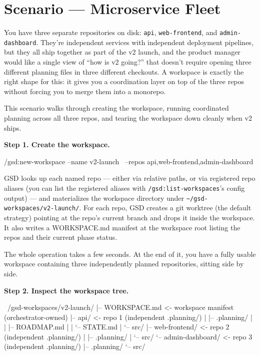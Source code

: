 \documentclass[11pt,letterpaper,openany]{book}
\begin{document}
\chapter{Scenario --- Microservice Fleet}

\begin{gsdscenario}

You have three separate repositories on disk: \texttt{api},
\texttt{web-frontend}, and \texttt{admin-dashboard}. They're
independent services with independent deployment pipelines, but
they all ship together as part of the v2 launch, and the product
manager would like a single view of ``how is v2 going?'' that
doesn't require opening three different planning files in three
different checkouts. A workspace is exactly the right shape for
this: it gives you a coordination layer on top of the three repos
without forcing you to merge them into a monorepo.

This scenario walks through creating the workspace, running
coordinated planning across all three repos, and tearing the
workspace down cleanly when v2 ships.

\textbf{Step 1. Create the workspace.}

\begin{gsdbash}
/gsd:new-workspace --name v2-launch \
  --repos api,web-frontend,admin-dashboard
\end{gsdbash}

\noindent
GSD looks up each named repo --- either via relative paths, or
via registered repo aliases (you can list the registered aliases
with \texttt{/gsd:list-workspaces}'s config output) --- and
materializes the workspace directory under
\texttt{\~{}/gsd-workspaces/v2-launch/}. For each repo, GSD creates
a git worktree (the default strategy) pointing at the repo's
current branch and drops it inside the workspace. It also writes
a WORKSPACE.md manifest at the workspace root listing the repos
and their current phase status.

The whole operation takes a few seconds. At the end of it, you
have a fully usable workspace containing three independently
planned repositories, sitting side by side.

\textbf{Step 2. Inspect the workspace tree.}

\begin{gsdplain}
~/gsd-workspaces/v2-launch/
|-- WORKSPACE.md          <- workspace manifest (orchestrator-owned)
|-- api/                  <- repo 1 (independent .planning/)
|   |-- .planning/
|   |   |-- ROADMAP.md
|   |   `-- STATE.md
|   `-- src/
|-- web-frontend/         <- repo 2 (independent .planning/)
|   |-- .planning/
|   `-- src/
`-- admin-dashboard/      <- repo 3 (independent .planning/)
    |-- .planning/
    `-- src/
\end{gsdplain}


\end{gsdscenario}
\end{document}
